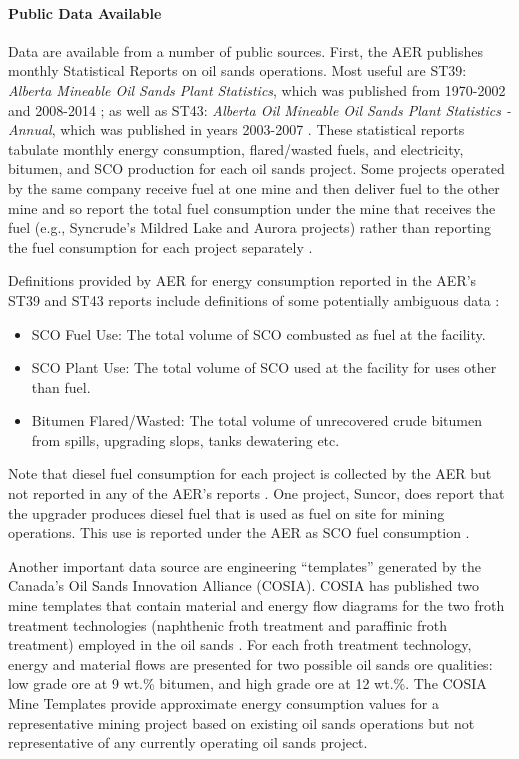 \documentclass[11pt]{report}
\begin{document}
\paragraph{Public Data Available}

Data are available from a number of public sources.  First, the AER publishes monthly Statistical Reports on oil sands operations. Most useful are ST39: \emph{Alberta Mineable Oil Sands Plant Statistics}, which was published from 1970-2002 and 2008-2014 \cite{AERvar}; as well as ST43: \emph{Alberta Oil Mineable Oil Sands Plant Statistics - Annual}, which was published in years 2003-2007 \cite{AERvarSt43}. These statistical reports tabulate monthly energy consumption, flared/wasted fuels, and electricity, bitumen, and SCO production for each oil sands project. Some projects operated by the same company receive fuel at one mine and then deliver fuel to the other mine and so report the total fuel consumption under the mine that receives the fuel (e.g., Syncrude's Mildred Lake and Aurora projects) rather than reporting the fuel consumption for each project separately \cite{AER2016}.
 
Definitions provided by AER for energy consumption reported in the AER's ST39 and ST43 reports include definitions of some potentially ambiguous data \cite{AER2016}:
\begin{itemize}
\item SCO Fuel Use: The total volume of SCO combusted as fuel at the facility.
\item SCO Plant Use: The total volume of SCO used at the facility for uses other than fuel.
\item Bitumen Flared/Wasted: The total volume of unrecovered crude bitumen from spills, upgrading slops, tanks dewatering etc.
\end{itemize}
Note that diesel fuel consumption for each project is collected by the AER but not reported in any of the AER's reports \cite{AER2016}. One project, Suncor, does report that the upgrader produces diesel fuel that is used as fuel on site for mining operations. This use is reported under the AER as SCO fuel consumption \cite{AERvar}.

Another important data source are engineering ``templates'' generated by the Canada's Oil Sands Innovation Alliance (COSIA). COSIA has published two mine templates that contain material and energy flow diagrams for the two froth treatment technologies (naphthenic froth treatment and paraffinic froth treatment) employed in the oil sands \cite{COSIA2015a, COSIA2015b}. For each froth treatment technology, energy and material flows are presented for two possible oil sands ore qualities: low grade ore at 9 wt.\% bitumen, and high grade ore at 12 wt.\%. The COSIA Mine Templates provide approximate energy consumption values for a representative mining project based on existing oil sands operations but not representative of any currently operating oil sands project.
\end{document}
